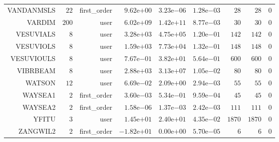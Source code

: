 \begin{longtable}{rrrrrrrrr}
VANDANMSLS & \(    22\) & first\_order & \( 9.62\)e\(+00\) & \( 3.23\)e\(-06\) & \( 1.28\)e\(-03\) & \(    28\) & \(    28\) & \(     0\) \\
VARDIM & \(   200\) & user & \( 6.02\)e\(+09\) & \( 1.42\)e\(+11\) & \( 8.77\)e\(-03\) & \(    30\) & \(    30\) & \(     0\) \\
VESUVIALS & \(     8\) & user & \( 3.28\)e\(+03\) & \( 4.75\)e\(+05\) & \( 1.20\)e\(-01\) & \(   142\) & \(   142\) & \(     0\) \\
VESUVIOLS & \(     8\) & user & \( 1.59\)e\(+03\) & \( 7.73\)e\(+04\) & \( 1.32\)e\(-01\) & \(   148\) & \(   148\) & \(     0\) \\
VESUVIOULS & \(     8\) & user & \( 7.67\)e\(-01\) & \( 3.82\)e\(+01\) & \( 5.64\)e\(-01\) & \(   600\) & \(   600\) & \(     0\) \\
VIBRBEAM & \(     8\) & user & \( 2.88\)e\(+03\) & \( 3.13\)e\(+07\) & \( 1.05\)e\(-02\) & \(    80\) & \(    80\) & \(     0\) \\
WATSON & \(    12\) & user & \( 6.69\)e\(-02\) & \( 2.09\)e\(+00\) & \( 2.94\)e\(-03\) & \(    55\) & \(    55\) & \(     0\) \\
WAYSEA1 & \(     2\) & first\_order & \( 3.60\)e\(-03\) & \( 5.34\)e\(-01\) & \( 9.59\)e\(-04\) & \(    45\) & \(    45\) & \(     0\) \\
WAYSEA2 & \(     2\) & first\_order & \( 1.58\)e\(-06\) & \( 1.37\)e\(-03\) & \( 2.42\)e\(-03\) & \(   111\) & \(   111\) & \(     0\) \\
YFITU & \(     3\) & user & \( 1.45\)e\(+01\) & \( 2.40\)e\(+01\) & \( 4.35\)e\(-02\) & \(  1870\) & \(  1870\) & \(     0\) \\
ZANGWIL2 & \(     2\) & first\_order & \(-1.82\)e\(+01\) & \( 0.00\)e\(+00\) & \( 5.70\)e\(-05\) & \(     6\) & \(     6\) & \(     0\) \\\hline
\end{longtable}
